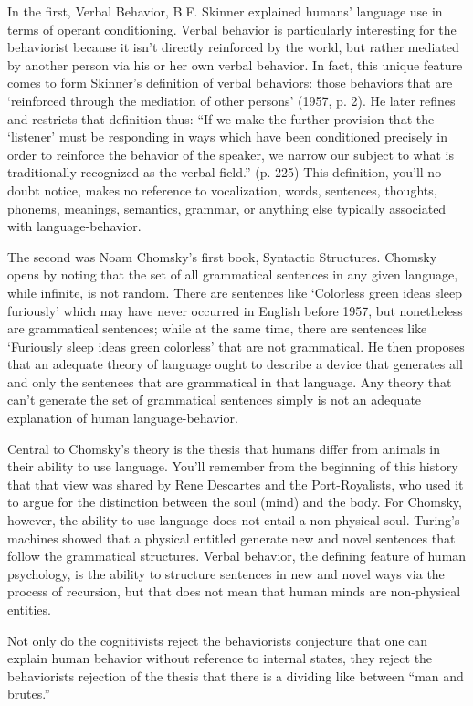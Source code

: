 In the first, Verbal Behavior, B.F. Skinner explained humans' language use in terms of operant conditioning. Verbal behavior is particularly interesting for the behaviorist because it isn't directly reinforced by the world, but rather mediated by another person via his or her own verbal behavior. In fact, this unique feature comes to form Skinner's definition of verbal behaviors: those behaviors that are `reinforced through the mediation of other persons' (1957, p. 2). He later refines and restricts that definition thus: “If we make the further provision that the `listener' must be responding in ways which have been conditioned precisely in order to reinforce the behavior of the speaker, we narrow our subject to what is traditionally recognized as the verbal field.” (p. 225) This definition, you'll no doubt notice, makes no reference to vocalization, words, sentences, thoughts, phonems, meanings, semantics, grammar, or anything else typically associated with language-behavior.

The second was Noam Chomsky's first book, Syntactic Structures. Chomsky opens by noting that the set of all grammatical sentences in any given language, while infinite, is not random. There are sentences like `Colorless green ideas sleep furiously' which may have never occurred in English before 1957, but nonetheless are grammatical sentences; while at the same time, there are sentences like `Furiously sleep ideas green colorless' that are not grammatical. He then proposes that an adequate theory of language ought to describe a device that generates all and only the sentences that are grammatical in that language. Any theory that can't generate the set of grammatical sentences simply is not an adequate explanation of human language-behavior.

Central to Chomsky's theory is the thesis that humans differ from animals in their ability to use language. You'll remember from the beginning of this history that that view was shared by Rene Descartes and the Port-Royalists, who used it to argue for the distinction between the soul (mind) and the body. For Chomsky, however, the ability to use language does not entail a non-physical soul. Turing's machines showed that a physical entitled generate new and novel sentences that follow the grammatical structures. Verbal behavior, the defining feature of human psychology, is the ability to structure sentences in new and novel ways via the process of recursion, but that does not mean that human minds are non-physical entities.

Not only do the cognitivists reject the behaviorists conjecture that one can explain human behavior without reference to internal states, they reject the behaviorists rejection of the thesis that there is a dividing like between “man and brutes.”

